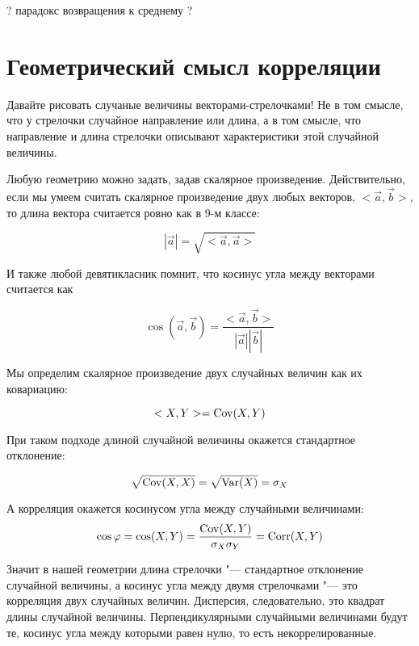 \documentclass[10pt]{article}
\newcommand\markangle[6]{%
  \begin{scope}
    \path[clip] (#1) -- (#2) -- (#3);
    \fill[color=red,fill opacity=0.5,draw=red,name path=circle]
    (#1) circle (#4);
  \end{scope}
  \path[name path=line one] (#1) -- (#2);
  \path[name path=line two] (#1) -- (#3);
  \path[%
  name intersections={of=line one and circle, by={inter one}},
  name intersections={of=line two and circle, by={inter two}}
  ] (inter one) -- (inter two) coordinate[pos=.5] (middle);
  \node at ($(#1)!#5!(middle)$) {#6};
}
\begin{document}
? парадокс возвращения к среднему ?


\section{Геометрический смысл корреляции}

Давайте рисовать случаные величины векторами-стрелочками! Не в том смысле, что у стрелочки случайное направление или длина, а в том смысле, что направление и длина стрелочки описывают характеристики этой случайной величины. 

Любую геометрию можно задать, задав скалярное произведение. Действительно, если мы умеем считать скалярное произведение двух любых векторов, $<\vec{a},\vec{b}>$, то длина вектора считается ровно как в 9-м классе:

\[
|\vec{a}|=\sqrt{<\vec{a},\vec{a}>}
\]

И также любой девятикласник помнит, что косинус угла между векторами считается как

\[
\cos(\vec{a},\vec{b})=\frac{<\vec{a},\vec{b}>}{|\vec{a}||\vec{b}|}
\]

Мы определим скалярное произведение двух случайных величин как их ковариацию:

\[
<X,Y>=\operatorname{Cov}(X,Y)
\]

При таком подходе длиной случайной величины окажется стандартное отклонение:

\[
\sqrt{\operatorname{Cov}(X,X)}=\sqrt{\operatorname{Var}(X)}=\sigma_X
\]

А корреляция окажется косинусом угла между случайными величинами:
\[
\cos \varphi =\cos(X,Y)=\frac{\operatorname{Cov}(X,Y)}{\sigma_X\sigma_Y}=\operatorname{Corr}(X,Y)
\]


\begin{center}
\end{center}

Значит в нашей геометрии  длина стрелочки "--- стандартное отклонение случайной величины, а косинус угла между двумя стрелочками "--- это корреляция двух случайных величин. Дисперсия, следовательно, это квадрат длины случайной величины. Перпендикулярными случайными величинами будут те, косинус угла между которыми равен нулю, то есть некоррелированные.
\end{document}
